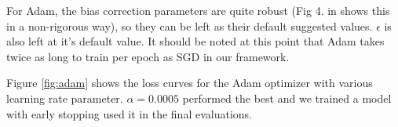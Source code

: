 \documentclass{article}
\begin{document}
For Adam, the bias correction parameters are quite robust (Fig 4. in \cite{kingma2014adam} shows this in a non-rigorous way), so they can be left as their default suggested values. $\epsilon$ is also left at it's default value. It should be noted at this point that Adam takes twice as long to train per epoch as SGD in our framework.

Figure \ref{fig:adam} shows the loss curves for the Adam optimizer with various learning rate parameter. $\alpha=0.0005$ performed the best and we trained a model with early stopping used it in the final evaluations.



\end{document}
